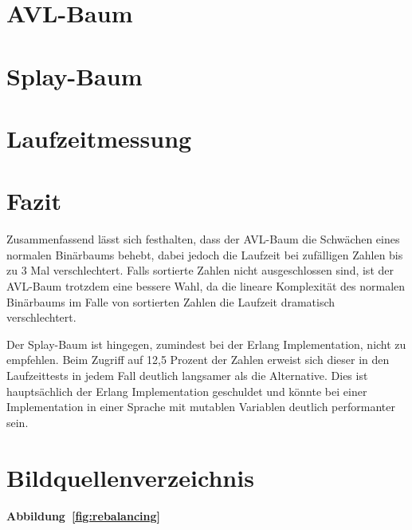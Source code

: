 \documentclass[a4paper]{article}
\begin{document}
    \section{AVL-Baum}\label{sec:avl-tree}
    

    \FloatBarrier
    \newpage

    \section{Splay-Baum}\label{sec:splay-tree}
    

    \FloatBarrier
    \newpage

    \section{Laufzeitmessung}\label{sec:laufzeitmessung}
    

    \section{Fazit}\label{sec:fazit}
    Zusammenfassend lässt sich festhalten, dass der AVL-Baum die Schwächen eines normalen
    Binärbaums behebt, dabei jedoch die Laufzeit bei zufälligen Zahlen bis zu 3 Mal verschlechtert.
    Falls sortierte Zahlen nicht ausgeschlossen sind, ist der AVL-Baum trotzdem eine bessere
    Wahl, da die lineare Komplexität des normalen Binärbaums im Falle von sortierten Zahlen die
    Laufzeit dramatisch verschlechtert.

    Der Splay-Baum ist hingegen, zumindest bei der Erlang Implementation, nicht zu empfehlen.
    Beim Zugriff auf 12,5 Prozent der Zahlen erweist sich dieser in den Laufzeittests
    in jedem Fall deutlich langsamer als die Alternative.
    Dies ist hauptsächlich der Erlang Implementation geschuldet und könnte bei einer
    Implementation in einer Sprache mit mutablen Variablen deutlich performanter sein.

    \FloatBarrier
    \newpage
    \appendix

    \section{Bildquellenverzeichnis}\label{sec:bildquellen}

    \paragraph{Abbildung~\ref{fig:rebalancing}}\mbox{}\\
\end{document}
